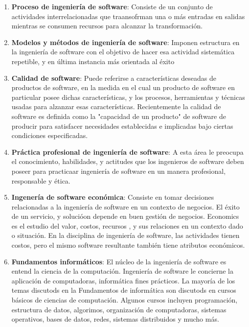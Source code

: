 \documentclass[11pt, a4paper]{article} %
\begin{document}
\begin{enumerate}
        \item \textbf{Proceso de ingeniería de software}: Consiste de un conjunto de actividades
            interrelacionadas que traansofrman una o más entradas en salidas mientras se consumen
            recursos para alcanzar la transformación.

        \item \textbf{Modelos y métodos de ingeniería de software}: Imponen estructura en la
            ingeniería de software con el objetivo de hacer esa actividad sistemática repetible,
            y en última instancia más orientada al éxito

        \item \textbf{Calidad de software}: Puede referirse a características deseadas de productos
            de software, en la medida en el cual un producto de software en particular
            posee dichas características, y los procesos, herramientas y técnicas usadas
            para alzanzar esas características. Recientemente la calidad de software es definida
            como la "capacidad de un producto" de software de producir para satisfacer necesidades
            establecidas e implicadas bajo ciertas condiciones especificadas.

        \item \textbf{Práctica profesional de ingeniería de software}: A esta área le preocupa
            el conocimiento, habilidades, y actitudes que los ingenieros de software deben
            poseer para practicaar ingeniería de software en un manera profesional,
            responsable y ética.

        \item \textbf{Ingenería de software económica}: Consiste en tomar decisiones relacionadas
            a la ingeniería de software en un contexto de negocios. El éxito de un
            servicio, y solucióon depende en buen gestión de negocios. Economics es el
            estudio del valor, costos, recursos , y sus relaciones en un contexto dado o
            situación. En la disciplina de ingeniería de software, las actividades tienen
            costos, pero el mismo software resultante también tiene atributos económicos.

        \item \textbf{Fundamentos informáticos}: El núcleo de la ingeniería de software es
            entend la ciencia de la computación. Ingeniería de software le concierne la
            aplicación de computadoras, informática fines prácticos. La mayoría de los
            temas discutods en la Fundamentos de informática son discutods en cursos
            básicos de ciencias de computación. Algunos cursos incluyen programación,
            estructura de datos, algorimos, organización de computadoras, sistemas operativos,
            bases de datos, redes, sistemas distribuidos y mucho más.


\end{enumerate}
\end{document}
